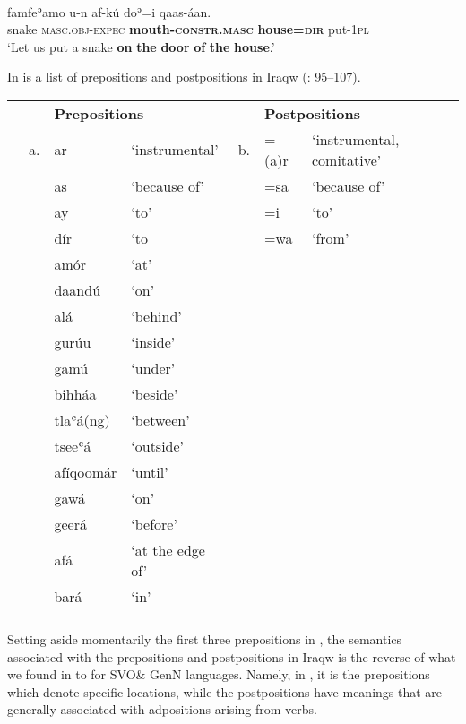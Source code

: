 \documentclass[output=paper]{langsci/langscibook}
\begin{document}
\ea\label{ex:dryer:}
\\
\gll famfeʾamo  u-n  af-kú  doʾ=i  qaas-áan.\\
       snake  \textsc{masc.obj-expec}  \textbf{mouth-\textsc{constr.masc}}  \textbf{house=\textsc{dir}}  put-\textsc{1pl}  \\
\glt ‘Let us put a snake \textbf{on} \textbf{the} \textbf{door} \textbf{of} \textbf{the} \textbf{house}.’
\z

In  is a list of prepositions and postpositions in Iraqw (\citealt{Mous1993}: 95–107).


\begin{table}
\begin{tabularx}{\textwidth}{XXXXXXX}
\lsptoprule
&  & \multicolumn{2}{X}{\bfseries Prepositions} &  & \multicolumn{2}{X}{\bfseries Postpositions}\\
& a. & ar & ‘instrumental’ & b. & =(a)r & ‘instrumental, comitative’\\
&  & as & ‘because of’ &  & =sa & ‘because of’\\
&  & ay & ‘to’ &  & =i & ‘to’\\
&  & dír & ‘to &  & =wa & ‘from’\\
&  & amór & ‘at’ &  &  & \\
&  & daandú & ‘on’ &  &  & \\
&  & alá & ‘behind’ &  &  & \\
&  & gurúu & ‘inside’ &  &  & \\
&  & gamú & ‘under’ &  &  & \\
&  & bihháa & ‘beside’ &  &  & \\
&  & tlaʿá(ng) & ‘between’ &  &  & \\
&  & tseeʿá & ‘outside’ &  &  & \\
&  & afíqoomár & ‘until’ &  &  & \\
&  & gawá & ‘on’ &  &  & \\
&  & geerá & ‘before’ &  &  & \\
&  & afá & ‘at the edge of’ &  &  & \\
&  & bará & ‘in’ &  &  & \\
\lspbottomrule
\end{tabularx}
\end{table}

Setting aside momentarily the first three prepositions in , the semantics associated with the prepositions and postpositions in Iraqw is the reverse of what we found in  to  for SVO\& GenN languages. Namely, in , it is the prepositions which denote specific locations, while the postpositions have meanings that are generally associated with adpositions arising from verbs.
\end{document}
